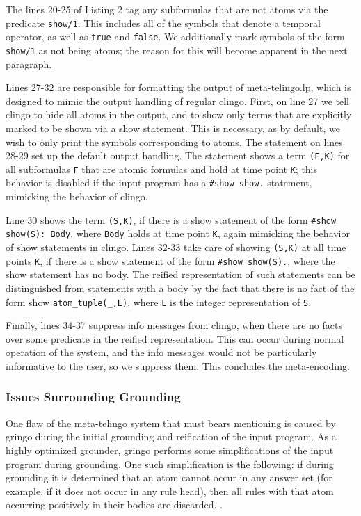 The lines 20-25 of Listing 2 tag any subformulas that are not atoms
via the predicate \verb|show/1|. This includes all of the symbols that
denote a temporal operator, as well as \verb|true| and
\verb|false|. We additionally mark symbols of the form \verb|show/1|
as not being atoms; the reason for this will become apparent in the
next paragraph.

Lines 27-32 are responsible for formatting the output of
meta-telingo.lp, which is designed to mimic the output handling of
regular clingo. First, on line 27 we tell clingo to hide all atoms in
the output, and to show only terms that are explicitly marked to be
shown via a show statement. This is necessary, as by default, we wish
to only print the symbols corresponding to atoms. The statement on
lines 28-29 set up the default output handling. The statement shows a
term \verb|(F,K)| for all subformulas \verb|F| that are atomic
formulas and hold at time point \verb|K|; this behavior is disabled
if the input program has a \verb|#show show.| statement, mimicking the
behavior of clingo.

Line 30 shows the term \verb|(S,K)|, if there is a show statement of
the form \verb|#show show(S): Body|, where \verb|Body| holds at time
point \verb|K|, again mimicking the behavior of show statements in
clingo. Lines 32-33 take care of showing \verb|(S,K)| at all time
points \verb|K|, if there is a show statement of the form
\verb|#show show(S).|, where the show statement has no body. The
reified representation of such statements can be distinguished from
statements with a body by the fact that there is no fact of the form
show \verb|atom_tuple(_,L)|, where \verb|L| is the integer
representation of \verb|S|.

Finally, lines 34-37 suppress info messages from clingo, when there
are no facts over some predicate in the reified representation. This
can occur during normal operation of the system, and the info messages
would not be particularly informative to the user, so we suppress
them. This concludes the meta-encoding.

\subsubsection{Issues Surrounding Grounding}

One flaw of the meta-telingo system that must bears mentioning is
caused by gringo during the initial grounding and reification of the
input program. As a highly optimized grounder, gringo performs some
simplifications of the input program during grounding. One such
simplification is the following: if during grounding it is determined
that an atom cannot occur in any answer set (for example, if it does
not occur in any rule head), then all rules with that atom occurring
positively in their bodies are discarded. \cite{gekakasc12a}.

